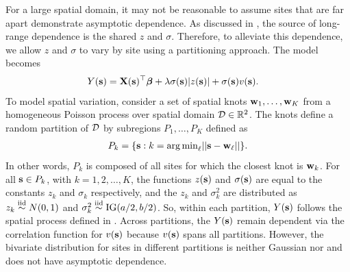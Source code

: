For a large spatial domain, it may not be reasonable to assume sites that are far apart demonstrate asymptotic dependence.%
As discussed in , the source of long-range dependence is the shared $z$ and $\sigma$.
Therefore, to alleviate this dependence, we allow $z$ and $\sigma$ to vary by site using a partitioning approach.
The model becomes
\begin{align} \label{steq:partition}
  Y(\mathbf{s}) &= \mathbf{X}(\mathbf{s})^\top \mbox{\boldmath $\beta$} + \lambda \sigma(\mathbf{s}) |z(\mathbf{s})| + \sigma(\mathbf{s}) v(\mathbf{s}).
\end{align}
To model spatial variation, consider a set of spatial knots $\mathbf{w}_1, \ldots, \mathbf{w}_K$ from a homogeneous Poisson process over spatial domain ${\cal D} \in \mathbb{R}^2$.
The knots define a random partition of ${\cal D}$ by subregions $P_{1}, \ldots, P_{K}$ defined as
\begin{align} \label{steq:subregions}
  P_{k} = \{ \mathbf{s} : k = {\mathop{\rm arg\, min}}_\ell || \mathbf{s} - \mathbf{w}_{\ell} || \}.
\end{align}
In other words, $P_k$ is composed of all sites for which the closest knot is $\mathbf{w}_k$.
For all $\mathbf{s} \in P_k$, with $k = 1, 2, \ldots, K$, the functions $z(\mathbf{s})$ and $\sigma(\mathbf{s})$ are equal to the constants $z_k$ and $\sigma_k$ respectively, and the $z_k$ and $\sigma^2_k$ are distributed as $z_k \stackrel{\mathrm{iid}}{\sim} N(0, 1)$ and $\sigma^2_k \stackrel{\mathrm{iid}}{\sim} \mathrm{IG}(a / 2, b / 2)$.
So, within each partition, $Y(\mathbf{s})$ follows the spatial \skewt{} process defined in .
Across partitions, the $Y(\mathbf{s})$ remain dependent via the correlation function for $v(\mathbf{s})$ because $v(\mathbf{s})$ spans all partitions.
However, the bivariate distribution for sites in different partitions is neither Gaussian nor \skewt{} and does not have asymptotic dependence.

